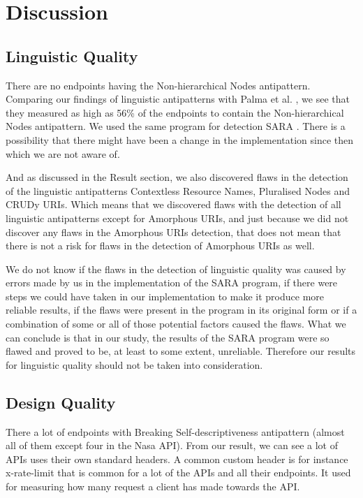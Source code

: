 \section{Discussion}

\subsection{Linguistic Quality}

There are no endpoints having the Non-hierarchical Nodes antipattern. Comparing our findings of linguistic antipatterns with Palma et al. \cite{linguistic}, we see that they measured as high as 56\% of the endpoints to contain the Non-hierarchical Nodes antipattern. We used the same program for detection SARA \cite{linguistic}. There is a possibility that there might have been a change in the implementation since then which we are not aware of.

And as discussed in the Result section, we also discovered flaws in the detection of the linguistic antipatterns Contextless Resource Names, Pluralised Nodes and CRUDy URIs. Which means that we discovered flaws with the detection of all linguistic antipatterns except for Amorphous URIs, and just because we did not discover any flaws in the Amorphous URIs detection, that does not mean that there is not a risk for flaws in the detection of Amorphous URIs as well.

We do not know if the flaws in the detection of linguistic quality was caused by errors made by us in the implementation of the SARA program, if there were steps we could have taken in our implementation to make it produce more reliable results, if the flaws were present in the program in its original form or if a combination of some or all of those potential factors caused the flaws. What we can conclude is that in our study, the results of the SARA program were so flawed and proved to be, at least to some extent, unreliable. Therefore our results for linguistic quality should not be taken into consideration.

\subsection{Design Quality}

There a lot of endpoints with Breaking Self-descriptiveness antipattern (almost all of them except four in the Nasa API). From our result, we can see a lot of APIs uses their own standard headers. A common custom header is for instance x-rate-limit that is common for a lot of the APIs and all their endpoints. It used for measuring how many request a client has made towards the API. 

